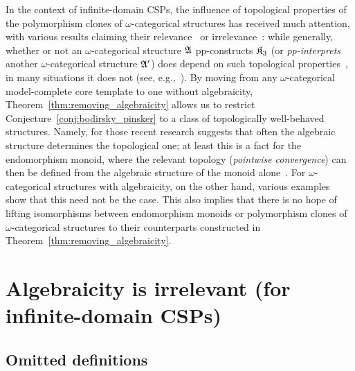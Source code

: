   In the context of infinite-domain CSPs, the influence of topological properties of the polymorphism clones of $\omega$-categorical structures has received much attention, with various results claiming their relevance~\cite{bodirsky_relevant_2019} or irrelevance~\cite{barto_pinsker_journal}: while generally, whether or not an $\omega$-categorical structure $\mathfrak{A}$ pp-constructs $\mathfrak{K}_3$ (or \emph{pp-interprets} another $\omega$-categorical structure $\mathfrak{A'}$) does depend on such topological properties~\cite{barto2018wonderland,Topo-Birk,uniformbirkhoff,  bodirsky2021projective}, in many situations it does not (see, e.g.,~\cite{EJMPP}). 
    By moving from any $\omega$-categorical model-complete core template to one without algebraicity, Theorem~\ref{thm:removing_algebraicity} allows us to restrict Conjecture~\ref{conj:bodirsky_pinsker} to a class of topologically well-behaved structures. Namely, for those recent research suggests that often the algebraic structure determines the topological one; at least this is a fact for the endomorphism monoid, where the relevant topology (\emph{pointwise convergence}) can then be defined from the algebraic structure of the monoid alone~\cite{PINSKER_SCHINDLER_2023}.
     For $\omega$-categorical structures with algebraicity, on the other hand, various examples~\cite{evans_counterexample_1990, bodirsky_counterexample_2018,PINSKER_SCHINDLER_2023} show that this need not be the case. This also implies that there is no hope of lifting isomorphisms between endomorphism monoids or polymorphism clones of $\omega$-categorical structures to their counterparts constructed in Theorem~\ref{thm:removing_algebraicity}.  









 

\appendix
\section{Algebraicity is irrelevant (for infinite-domain CSPs)}\label{appendix:section_algebraicity}

\subsection{Omitted definitions}\label{appendix:subsection_definitions}



